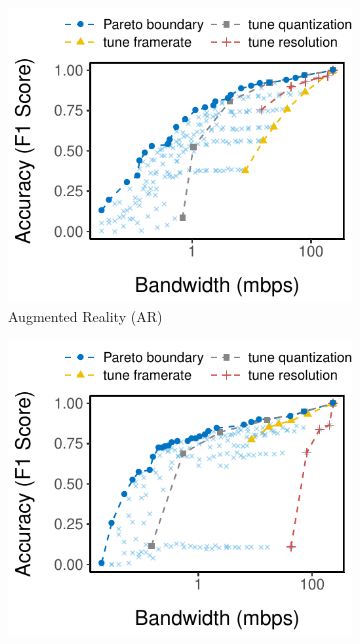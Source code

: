 \begin{figure}[htb]
  \centering
  \begin{subfigure}[t]{0.28\textwidth}
    \centering
    \includegraphics[width=\textwidth]{figures/profile-darknet.pdf}
    \caption{Augmented Reality (AR)}
    \label{fig:ar-profile}
  \end{subfigure}
  \hfill
  \begin{subfigure}[t]{0.28\textwidth}
    \centering
    \includegraphics[width=\textwidth]{figures/profile-mot.pdf}

\end{subfigure}
\end{figure}
